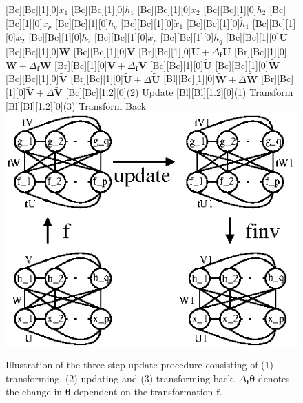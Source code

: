 \documentclass{now}
\newcommand{\vect}[1]{\mathbf{#1}}
\newcommand{\vects}[1]{\boldsymbol{#1}}
\newcommand{\matr}[1]{\mathbf{#1}}
\newcommand{\vf}[0]{\vect{f}}
\newcommand{\mW}[0]{\matr{W}}
\newcommand{\mU}[0]{\matr{U}}
\newcommand{\mV}[0]{\matr{V}}
\newcommand{\TT}[0]{{\vects{\theta}}}
\begin{document}
\begin{figure}[t]
    \centering
    [Bc][Bc][1][0]{$x_1$}
    [Bc][Bc][1][0]{$h_1$}
    [Bc][Bc][1][0]{$x_2$}
    [Bc][Bc][1][0]{$h_2$}
    [Bc][Bc][1][0]{$x_p$}
    [Bc][Bc][1][0]{$h_q$}
    [Bc][Bc][1][0]{$\tilde{x}_1$}
    [Bc][Bc][1][0]{$\tilde{h}_1$}
    [Bc][Bc][1][0]{$\tilde{x}_2$}
    [Bc][Bc][1][0]{$\tilde{h}_2$}
    [Bc][Bc][1][0]{$\tilde{x}_p$}
    [Bc][Bc][1][0]{$\tilde{h}_q$}
    [Bc][Bc][1][0]{$\mU$}
    [Bc][Bc][1][0]{$\mW$}
    [Bc][Bc][1][0]{$\mV$}
    [Br][Bc][1][0]{$\mU+\Delta_\vf \mU$}
    [Br][Bc][1][0]{$\mW+\Delta_\vf \mW$}
    [Br][Bc][1][0]{$\mV+\Delta_\vf \mV$}
    [Bc][Bc][1][0]{$\tilde{\mU}$}
    [Bc][Bc][1][0]{$\tilde{\mW}$}
    [Bc][Bc][1][0]{$\tilde{\mV}$}
    [Br][Bc][1][0]{$\tilde{\mU}+\Delta\tilde{\mU}$}
    [Bl][Bc][1][0]{$\tilde{\mW}+\Delta\tilde{\mW}$}
    [Br][Bc][1][0]{$\tilde{\mV}+\Delta\tilde{\mV}$}
    [Bc][Bc][1.2][0]{(2) Update}
    [Bl][Bl][1.2][0]{(1) Transform}
    [Bl][Bl][1.2][0]{(3) Transform Back}
    \includegraphics[width=0.8\columnwidth]{../figures/fbm_3step.eps}
    \caption{
        Illustration of the three-step update procedure consisting of (1)
        transforming, (2) updating and (3) transforming back. $\Delta_\vf \TT$
        denotes the change in $\TT$ dependent on the transformation $\vf$.
    }
    \label{fig:bm_three_step_update}
\end{figure}
\end{document}
